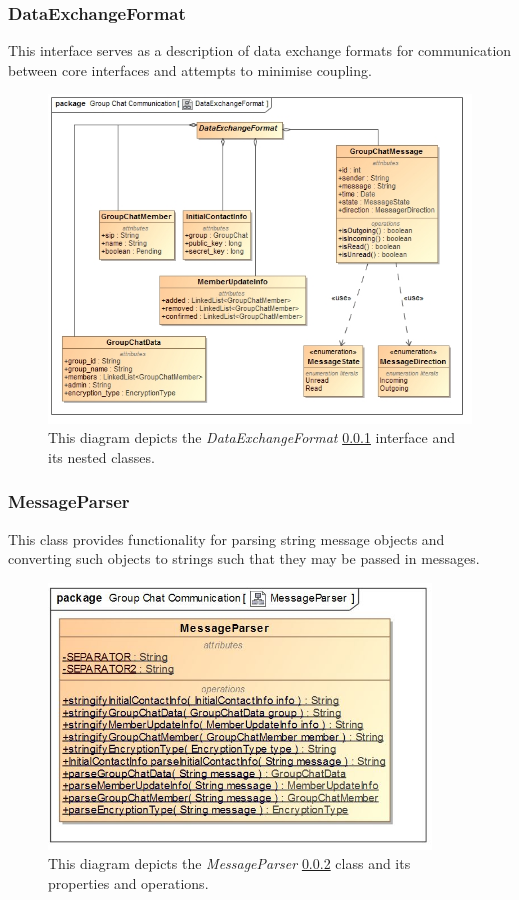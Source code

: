 \documentclass[11pt]{article}
\begin{document}
\subsubsection{DataExchangeFormat} \label{ssc: dataexchangeformat}
This interface serves as a description of data exchange formats for communication between core interfaces and attempts to minimise coupling.\\
\begin{figure}[H]
	\centering
	\centering
	\centerline{\includegraphics[width=6in]{./images/class_data_exchange_format.jpg}}
	\caption[DataExchangeFormat Class Diagram]{This diagram depicts the \textit{DataExchangeFormat} \ref{ssc: dataexchangeformat} interface and its nested classes.}
	\label{cd-data-exchange-format}
\end{figure}

\subsubsection{MessageParser}\label{ssc: messageparser}
This class provides functionality for parsing string message objects and converting such objects to strings such that they may be passed in messages.
\begin{figure}[H]
	\centering
	\includegraphics[width=4in]{./images/class_message_parser.jpg}
	\caption[MessageParser Class Diagram]{This diagram depicts the \textit{MessageParser} \ref{ssc: messageparser} class and its properties and operations.}
	\label{cd-message-parser}
\end{figure}
\end{document}
